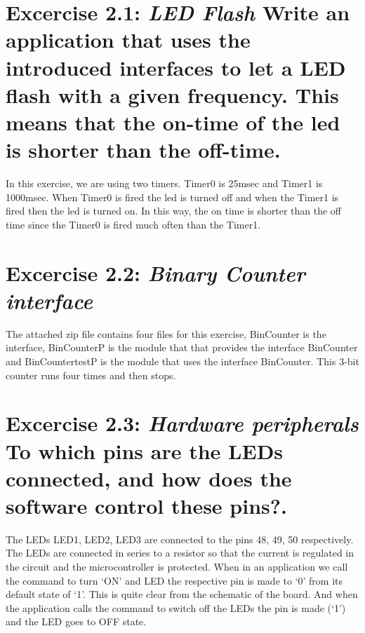\documentclass[11pt]{article} %
\begin{document}
\section*{Excercise 2.1: \textnormal{\large{\textit{LED Flash} Write an application that uses the introduced interfaces
to let a LED flash with a given frequency. This means that the on-time of the led is shorter than the off-time.}}}
In this exercise, we are using two timers. Timer0 is 25msec and Timer1 is 1000msec. When Timer0 is fired the led is turned off and when the Timer1 is fired then the led is turned on. In this way, the on time is shorter than the off time since the Timer0 is fired much often than the Timer1.

\section*{Excercise 2.2: \textnormal{\large{\textit{Binary Counter interface}}}}
The attached zip file contains four files for this exercise, BinCounter is the interface, BinCounterP is the module that that provides the interface BinCounter and BinCountertestP is the module that uses the interface BinCounter. This 3-bit counter runs four times and then stops.

\section*{Excercise 2.3: \textnormal{\large{\textit{Hardware peripherals} To which pins are the LEDs connected, and how does the software control these pins?.}}}
The LEDs LED1, LED2, LED3 are connected to the pins 48, 49, 50 respectively. The LEDs are connected in series to a resistor so that the current is regulated in the circuit and the microcontroller is protected. When in an application we call the command to turn `ON' and LED the respective pin is made to `0' from its default state of `1'. This is quite clear from the schematic of the board. And when the application calls the command to switch off the LEDs the pin is made (`1') and the LED goes to OFF state.
\end{document}
